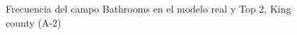 \begin{figure}[H]
    \centering
    
    \caption{Frecuencia del campo Bathrooms en el modelo real y Top 2, King county (A-2)}
    \label{frecuency-top2-bathrooms}
\end{figure}